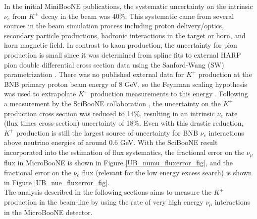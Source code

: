 In the initial MiniBooNE publications, the systematic uncertainty on the intrinsic $\nu_e$ from $K^+$ decay in the beam was 40\%. This systematic came from several sources in the beam simulation process including proton delivery/optics, secondary particle productions, hadronic interactions in the target or horn, and horn magnetic field. In contrast to kaon production, the uncertainty for pion production is small since it was determined from spline fits to external HARP pion double differential cross section data using the Sanford-Wang (SW) parametrization \cite{SanfordWangGary7} \cite{HARPgary8}. There was no published external data for $K^+$ production at the BNB primary proton beam energy of 8 GeV, so the Feynman scaling hypothesis was used to extrapolate $K^+$ production measurements to this energy \cite{FEYNMANgary6}. Following a measurement by the SciBooNE collaboration \cite{gary_kaon_production_paper}, the uncertainty on the $K^+$ production cross section was reduced to 14\%, resulting in an intrinsic $\nu_e$ rate (flux times cross-section) uncertainty of 18\%. Even with this drastic reduction, $K^+$ production is still the largest source of uncertainty for BNB $\nu_e$ interactions above neutrino energies of around 0.6 GeV. With the SciBooNE result incorporated into the estimation of flux systematics, the fractional error on the $\nu_\mu$ flux in MicroBooNE is shown in Figure \ref{UB_numu_fluxerror_fig}, and the fractional error on the $\nu_e$ flux (relevant for the low energy excess search) is shown in Figure \ref{UB_nue_fluxerror_fig}.\\

The analysis described in the following sections aims to measure the $K^+$ production in the beam-line by using the rate of very high energy $\nu_\mu$ interactions in the MicroBooNE detector.


